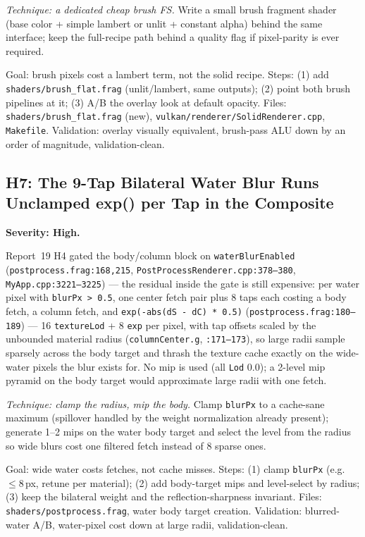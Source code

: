 \documentclass[11pt,a4paper]{article}
\begin{document}
\textit{Technique: a dedicated cheap brush FS.} Write a small brush fragment
shader (base color + simple lambert or unlit + constant alpha) behind the
same interface; keep the full-recipe path behind a quality flag if
pixel-parity is ever required.

\begin{tcolorbox}[promptbox={Prompt --- H6: cheap brush fragment shader}]
Goal: brush pixels cost a lambert term, not the solid recipe. Steps:
(1) add \texttt{shaders/brush\_flat.frag} (unlit/lambert, same outputs);
(2) point both brush pipelines at it; (3) A/B the overlay look at default
opacity. Files: \texttt{shaders/brush\_flat.frag} (new),
\texttt{vulkan/renderer/SolidRenderer.cpp}, \texttt{Makefile}.
Validation: overlay visually equivalent, brush-pass ALU down by an order of
magnitude, validation-clean.
\end{tcolorbox}

\subsection{H7: The 9-Tap Bilateral Water Blur Runs Unclamped exp() per Tap in the Composite}
\label{sec:h7}

\textbf{Severity: High.}

Report~19 H4 gated the body/column block on \texttt{waterBlurEnabled}
(\texttt{postprocess.frag:168,215}, \texttt{PostProcessRenderer.cpp:378--380},
\texttt{MyApp.cpp:3221--3225}) --- the residual inside the gate is still
expensive: per water pixel with \texttt{blurPx > 0.5}, one center fetch pair
plus 8 taps each costing a body fetch, a column fetch, and
\texttt{exp(-abs(dS - dC) * 0.5)} (\texttt{postprocess.frag:180--189}) ---
16 \texttt{textureLod} + 8 \texttt{exp} per pixel, with tap offsets scaled by
the unbounded material radius (\texttt{columnCenter.g}, \texttt{:171--173}),
so large radii sample sparsely across the body target and thrash the texture
cache exactly on the wide-water pixels the blur exists for. No mip is used
(all \texttt{Lod} 0.0); a 2-level mip pyramid on the body target would
approximate large radii with one fetch.

\textit{Technique: clamp the radius, mip the body.} Clamp
\texttt{blurPx} to a cache-sane maximum (spillover handled by the weight
normalization already present); generate 1--2 mips on the water body target
and select the level from the radius so wide blurs cost one filtered fetch
instead of 8 sparse ones.

\begin{tcolorbox}[promptbox={Prompt --- H7: bounded water-blur kernel}]
Goal: wide water costs fetches, not cache misses. Steps: (1) clamp
\texttt{blurPx} (e.g.\ $\le 8$\,px, retune per material); (2) add body-target
mips and level-select by radius; (3) keep the bilateral weight and the
reflection-sharpness invariant. Files: \texttt{shaders/postprocess.frag},
water body target creation. Validation: blurred-water A/B, water-pixel cost
down at large radii, validation-clean.
\end{tcolorbox}
\end{document}
